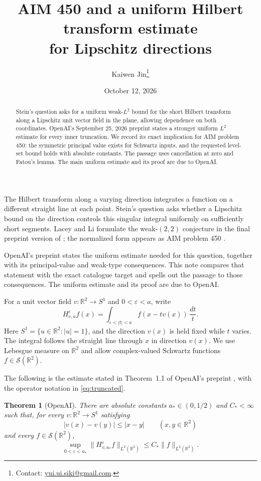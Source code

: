 \documentclass[11pt]{article}
\title{AIM 450 and a uniform Hilbert transform estimate\\
for Lipschitz directions}
\author{Kaiwen Jin\thanks{Contact: \href{mailto:yui.ui.siki@gmail.com}{yui.ui.siki@gmail.com}.}}
\date{October 12, 2026}
\newtheorem{theorem}{Theorem}
\newcommand{\R}{\mathbb R}
\newcommand{\Schwartz}{\mathcal S}
\begin{document}
\maketitle
\begin{abstract}
Stein's question asks for a uniform weak-$L^2$ bound for the short Hilbert
transform along a Lipschitz unit vector field in the plane, allowing dependence
on both coordinates. OpenAI's September 25, 2026 preprint states a stronger
uniform $L^2$ estimate for every inner truncation. We record its exact
implication for AIM problem 450: the symmetric principal value exists for
Schwartz inputs, and the requested level-set bound holds with absolute
constants. The passage uses cancellation at zero and Fatou's lemma. The main
uniform estimate and its proof are due to OpenAI.
\end{abstract}

The Hilbert transform along a varying direction integrates a function on a
different straight line at each point. Stein's question asks whether a
Lipschitz bound on the direction controls this singular integral uniformly
on sufficiently short segments. Lacey and Li formulate the weak-$(2,2)$
conjecture in the final preprint version of
\cite[Conjecture~1.5, equation~(1.6)]{LaceyLi}; the normalized form appears
as AIM problem 450 \cite{AIM}.

OpenAI's preprint \cite[Theorem~1.1]{OpenAI} states the uniform estimate
needed for this question, together with its principal-value and weak-type
consequences. This note compares that statement with the exact catalogue
target and spells out the passage to those consequences. The uniform
estimate and its proof are due to OpenAI.

For a unit vector field $v\colon\R^2\to S^1$ and $0<\varepsilon<a$,
write
\begin{equation}\label{eq:truncated}
 H^{\varepsilon}_{v,a}f(x)
 =\int_{\varepsilon<|t|<a}f(x-tv(x))\,\frac{dt}{t}.
\end{equation}
Here $S^1=\{u\in\R^2:|u|=1\}$, and the direction $v(x)$ is
held fixed while $t$ varies. The integral follows the straight line through
$x$ in direction $v(x)$. We use Lebesgue measure on $\R^2$ and allow
complex-valued Schwartz functions $f\in\Schwartz(\R^2)$.

The following is the estimate stated in Theorem~1.1 of OpenAI's preprint
\cite{OpenAI}, with the operator notation in \eqref{eq:truncated}.

\begin{theorem}[OpenAI]\label{thm:openai}
There are absolute constants $a_*\in(0,1/2)$ and $C_*<\infty$
such that, for every $v\colon\R^2\to S^1$ satisfying
\[
 |v(x)-v(y)|\le |x-y|\qquad(x,y\in\R^2)
\]
and every $f\in\Schwartz(\R^2)$,
\begin{equation}\label{eq:uniform}
 \sup_{0<\varepsilon<a_*}
 \bigl\|H^{\varepsilon}_{v,a_*}f\bigr\|_{L^2(\R^2)}
 \le C_*\|f\|_{L^2(\R^2)}.
\end{equation}
\end{theorem}
\end{document}
